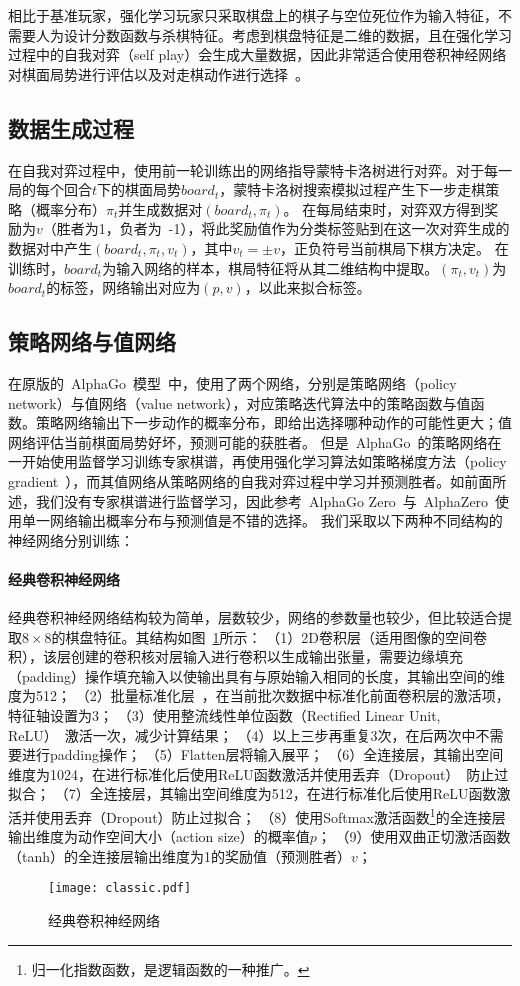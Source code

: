 相比于基准玩家，强化学习玩家只采取棋盘上的棋子与空位死位作为输入特征，不需要人为设计分数函数与杀棋特征。考虑到棋盘特征是二维的数据，且在强化学习过程中的自我对弈（self play）会生成大量数据，因此非常适合使用卷积神经网络对棋面局势进行评估以及对走棋动作进行选择~\cite{Silver2016}。

\subsection{数据生成过程}
在自我对弈过程中，使用前一轮训练出的网络指导蒙特卡洛树进行对弈。对于每一局的每个回合$t$下的棋面局势$board_{t}$，蒙特卡洛树搜索模拟过程产生下一步走棋策略（概率分布）$\pi_{t}$并生成数据对$(board_{t},\pi_{t})$。
在每局结束时，对弈双方得到奖励为$v$（胜者为1，负者为~-1），将此奖励值作为分类标签贴到在这一次对弈生成的数据对中产生$(board_{t},\pi_{t},v_{t})$，其中$v_{t}=\pm v$，正负符号当前棋局下棋方决定。
在训练时，$board_{t}$为输入网络的样本，棋局特征将从其二维结构中提取。$(\pi_{t},v_{t})$为$board_{t}$的标签，网络输出对应为$(p,v)$，以此来拟合标签。
\subsection{策略网络与值网络}
在原版的~AlphaGo~模型~\cite{Silver2016}中，使用了两个网络，分别是策略网络（policy network）与值网络（value network），对应策略迭代算法中的策略函数与值函数。策略网络输出下一步动作的概率分布，即给出选择哪种动作的可能性更大；值网络评估当前棋面局势好坏，预测可能的获胜者。
但是~AlphaGo~的策略网络在一开始使用监督学习训练专家棋谱，再使用强化学习算法如策略梯度方法（policy gradient~\cite{silver2014deterministic}），而其值网络从策略网络的自我对弈过程中学习并预测胜者。如前面所述，我们没有专家棋谱进行监督学习，因此参考~AlphaGo Zero~与~AlphaZero~使用单一网络输出概率分布与预测值是不错的选择。
我们采取以下两种不同结构的神经网络分别训练：
\paragraph{经典卷积神经网络}
经典卷积神经网络结构较为简单，层数较少，网络的参数量也较少，但比较适合提取$8\times8$的棋盘特征。其结构如图~\ref{fig:cnn}所示：
（1）2D卷积层（适用图像的空间卷积），该层创建的卷积核对层输入进行卷积以生成输出张量，需要边缘填充（padding）操作填充输入以使输出具有与原始输入相同的长度，其输出空间的维度为512；
（2）批量标准化层~\cite{batchnorm}，在当前批次数据中标准化前面卷积层的激活项，特征轴设置为3；
（3）使用整流线性单位函数（Rectified Linear Unit, ReLU）~\cite{xu2015empirical}激活一次，减少计算结果；
（4）以上三步再重复3次，在后两次中不需要进行padding操作；
（5）Flatten层将输入展平；
（6）全连接层，其输出空间维度为1024，在进行标准化后使用ReLU函数激活并使用丢弃（Dropout）~\cite{srivastava2014dropout}防止过拟合；
（7）全连接层，其输出空间维度为512，在进行标准化后使用ReLU函数激活并使用丢弃（Dropout）防止过拟合；
（8）使用Softmax激活函数\footnote{归一化指数函数，是逻辑函数的一种推广。}的全连接层输出维度为动作空间大小（action size）的概率值$p$；
（9）使用双曲正切激活函数（tanh）的全连接层输出维度为1的奖励值（预测胜者）$v$；
\begin{figure}[H]
    \centering
    \texttt{[image: classic.pdf]}
    \caption[cnn]{%
    经典卷积神经网络%
      }
    \label{fig:cnn}
\end{figure}
